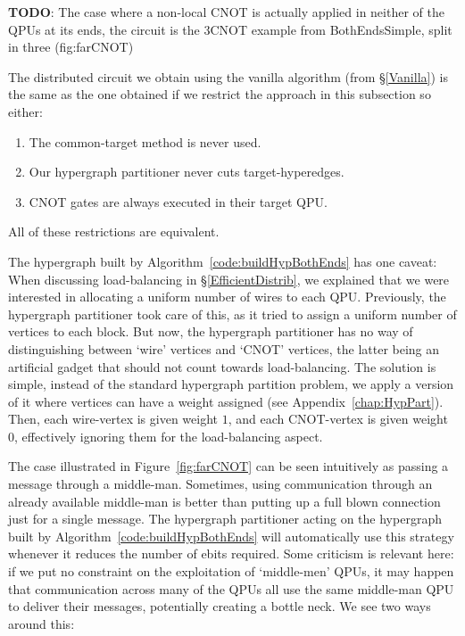 \textbf{TODO}: The case where a non-local CNOT is actually applied in neither of the QPUs at its ends, the circuit is the 3CNOT example from BothEndsSimple, split in three (fig:farCNOT)

\begin{corollary}
The distributed circuit we obtain using the vanilla algorithm (from \S\ref{Vanilla}) is the same as the one obtained if we restrict the approach in this subsection so either:
\begin{enumerate}
  \renewcommand{\theenumi}{\alph{enumi})}
  \item The common-target method is never used.
  \item Our hypergraph partitioner never cuts target-hyperedges.
  \item CNOT gates are always executed in their target QPU.
\end{enumerate}
All of these restrictions are equivalent.
\end{corollary}

The hypergraph built by Algorithm~\ref{code:buildHypBothEnds} has one caveat: When discussing load-balancing in \S\ref{EfficientDistrib}, we explained that we were interested in allocating a uniform number of wires to each QPU. Previously, the hypergraph partitioner took care of this, as it tried to assign a uniform number of vertices to each block. But now, the hypergraph partitioner has no way of distinguishing between `wire' vertices and `CNOT' vertices, the latter being an artificial gadget that should not count towards load-balancing. The solution is simple, instead of the standard hypergraph partition problem, we apply a version of it where vertices can have a weight assigned (see Appendix~\ref{chap:HypPart}). Then, each wire-vertex is given weight \(1\), and each CNOT-vertex is given weight \(0\), effectively ignoring them for the load-balancing aspect.

The case illustrated in Figure~\ref{fig:farCNOT} can be seen intuitively as passing a message through a middle-man. Sometimes, using communication through an already available middle-man is better than putting up a full blown connection just for a single message. The hypergraph partitioner acting on the hypergraph built by Algorithm~\ref{code:buildHypBothEnds} will automatically use this strategy whenever it reduces the number of ebits required. Some criticism is relevant here: if we put no constraint on the exploitation of `middle-men' QPUs, it may happen that communication across many of the QPUs all use the same middle-man QPU to deliver their messages, potentially creating a bottle neck. We see two ways around this:

